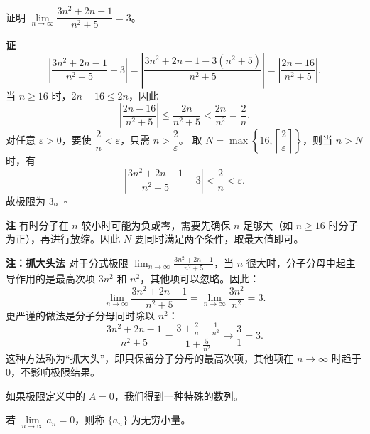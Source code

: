 \documentclass[fontset=fandol]{ctexart}
\newenvironment{custom}[1]{\par\noindent\textbf{#1}\quad}{\par\vspace{0.8em}}
\newenvironment{remark}{\par\noindent\textbf{注}\quad}{\par\vspace{0.8em}}
\begin{document}
\begin{example}证明 \(\lim\limits_{n\to\infty} \dfrac{3n^2 + 2n - 1}{n^2 + 5} = 3\)。
\end{example}
\begin{custom}{证}
\[
\left|\dfrac{3n^2 + 2n - 1}{n^2 + 5} - 3\right| = \left|\dfrac{3n^2 + 2n - 1 - 3(n^2 + 5)}{n^2 + 5}\right| = \left|\dfrac{2n - 16}{n^2 + 5}\right|.
\]
当 \(n \geq 16\) 时，\(2n - 16 \leq 2n\)，因此
\[
\left|\dfrac{2n - 16}{n^2 + 5}\right| \leq \dfrac{2n}{n^2 + 5} < \dfrac{2n}{n^2} = \dfrac{2}{n}.
\]
对任意 \(\varepsilon > 0\)，要使 \(\dfrac{2}{n} < \varepsilon\)，只需 \(n > \dfrac{2}{\varepsilon}\)。
取 \(N = \max\left\{16, \left\lceil \dfrac{2}{\varepsilon} \right\rceil\right\}\)，则当 \(n > N\) 时，有
\[
\left|\dfrac{3n^2 + 2n - 1}{n^2 + 5} - 3\right| < \dfrac{2}{n} < \varepsilon.
\]
故极限为 3。\(\square\)
\end{custom}

\begin{remark}
有时分子在 \(n\) 较小时可能为负或零，需要先确保 \(n\) 足够大（如 \(n \geq 16\) 时分子为正），再进行放缩。因此 \(N\) 要同时满足两个条件，取最大值即可。
\end{remark}

\begin{custom}{注：抓大头法}
对于分式极限 \(\lim_{n\to\infty} \frac{3n^2 + 2n - 1}{n^2 + 5}\)，当 \(n\) 很大时，分子分母中起主导作用的是最高次项 \(3n^2\) 和 \(n^2\)，其他项可以忽略。因此：
\[
\lim\limits_{n \to \infty} \frac{3n^2 + 2n - 1}{n^2 + 5} = \lim\limits_{n \to \infty} \frac{3n^2}{n^2} = 3.
\]
更严谨的做法是分子分母同时除以 \(n^2\)：
\[
\frac{3n^2 + 2n - 1}{n^2 + 5} = \frac{3 + \frac{2}{n} - \frac{1}{n^2}}{1 + \frac{5}{n^2}} \to \frac{3}{1} = 3.
\]
这种方法称为“抓大头”，即只保留分子分母的最高次项，其他项在 \(n\to\infty\) 时趋于 0，不影响极限结果。
\end{custom}
如果极限定义中的 \(A = 0\)，我们得到一种特殊的数列。

\begin{definition}[无穷小量]
	若 \(\lim\limits_{n\to\infty} a_n = 0\)，则称 \(\{a_n\}\) 为无穷小量。
\end{definition}
\end{document}
